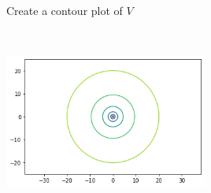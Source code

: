 Create a contour plot of $V$

\begin{solution} \
\begin{center}
    \includegraphics[width=0.5\textwidth]{img/e9p2.png}
\end{center}
\end{solution}